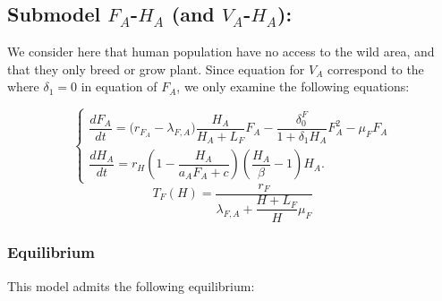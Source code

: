 \documentclass{article}
\newcommand{\lfa}{\lambda_{F, A}}
\begin{document}
\subsection{Submodel $F_A$-$H_A$ (and $V_A$-$H_A$):}

We consider here that human population have no access to the wild area, and that they only breed or grow plant. Since equation for $V_A$ correspond to the where $\delta_1 = 0$ in equation of $F_A$, we only examine the following equations:

\begin{equation}
\left\{ \begin{array}{l}
\dfrac{dF_{A}}{dt}= \Big(r_{F_A} - \lfa \Big)  \dfrac{H_A}{H_A+L_F}F_A - \dfrac{\delta_0^F}{1 +\delta_1 H_A}F_A^2-\mu_{F}F_A \\
\dfrac{dH_A}{dt}=r_{H}\left(1-\dfrac{H_A}{a_{A}F_{A} + c}\right)\left(\dfrac{H_A}{\beta}-1\right)H_A .
\end{array}\right.
\label{anthropicFH:Functional}
\end{equation}
$$
T_F(H) = \dfrac{r_F}{\lfa + \dfrac{H + L_F}{H} \mu_F}
$$

\subsubsection{Equilibrium}
This model admits the following equilibrium:
\end{document}
